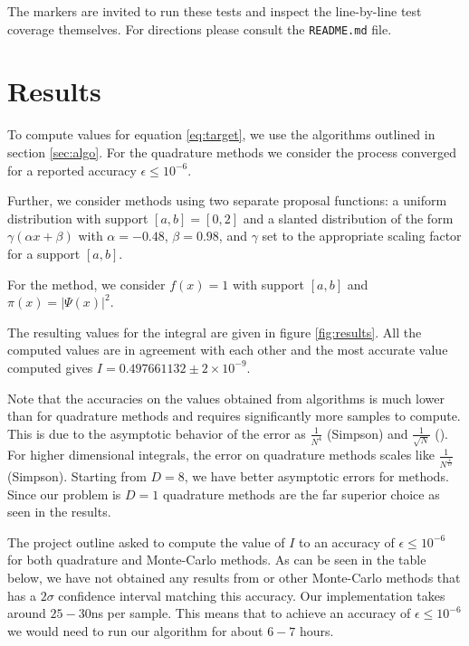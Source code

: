 \documentclass[10pt, a4paper]{article}
\newcommand{\final}{$I = 0.497661132 \pm 2\times10^{-9}$}
\begin{document}
  The markers are invited to run these tests and inspect the line-by-line test coverage themselves.
  For directions please consult the \texttt{README.md} file.

\section{Results}
  To compute values for equation \ref{eq:target}, we use the algorithms outlined in section \ref{sec:algo}.
  For the quadrature methods we consider the process converged for a reported accuracy $\epsilon \le 10^{-6}$.

  Further, we consider \is{} methods using two separate proposal functions: a uniform distribution with
  support $[a,b] = [0,2]$ and a slanted distribution of the form $\gamma(\alpha x + \beta)$ with $\alpha = -0.48$,
  $\beta = 0.98$, and $\gamma$ set to the appropriate scaling factor for a support $[a,b]$.

  For the \apis{} method, we consider $f(x) = 1$ with support $[a,b]$ and $\pi(x) = |\Psi(x)|^2$.

  The resulting values for the integral are given in figure \ref{fig:results}. All the computed values
  are in agreement with each other and the most accurate value computed gives \final.

  Note that the accuracies on the values obtained from \is{} algorithms is much lower than for quadrature
  methods and requires significantly more samples to compute. This is due to the asymptotic behavior of
  the error as $\frac{1}{N^4}$ (Simpson) and $\frac{1}{\sqrt{N}}$ (\is). For higher dimensional integrals,
  the error on quadrature methods scales like $\frac{1}{N^{\frac4D}}$ (Simpson). Starting from $D=8$, we have
  better asymptotic errors for \is{} methods. Since our problem is $D=1$ quadrature methods are
  the far superior choice as seen in the results.

  The project outline asked to compute the value of $I$ to an accuracy of $\epsilon \le 10^{-6}$ for
  both quadrature and Monte-Carlo methods. As can be seen in the table below, we have not obtained
  any results from \is{} or other Monte-Carlo methods that has a $2\sigma$ confidence interval matching
  this accuracy. Our implementation takes around $25-30$ns per sample. This means that to achieve an
  accuracy of $\epsilon \le 10^{-6}$ we would need to run our algorithm for about $6-7$ hours\footnotemark.

\end{document}
